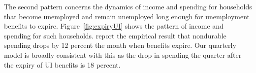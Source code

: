 \documentclass[\latexroot/\projectname]{subfiles}
\begin{document}
\whenintegrated{\label{ganong-noel}}

The second pattern concerns the dynamics of income and spending for households that become unemployed and remain unemployed long enough for unemployment benefits to expire.
Figure~\ref{fig:expiryUI} shows the pattern of income and spending for such households.
\cite{ganongConsumer2019} report the empirical result that nondurable spending drops by 12 percent the month when benefits expire.
Our quarterly model is broadly consistent with this as the drop in spending the quarter after the expiry of UI benefits is 18 percent.


\smartbib
\end{document}
